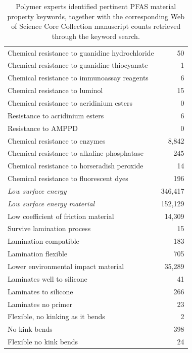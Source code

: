 \begin{table}[h!]
\begin{tabular}{|l|r|}
Chemical resistance to guanidine hydrochloride & 50 \\
Chemical resistance to guanidine thiocyanate & 1 \\
Chemical resistance to immunoassay reagents & 6 \\
Chemical resistance to luminol & 15 \\
Chemical resistance to acridinium esters & 0 \\
Resistance to acridinium esters & 6 \\
Resistance to AMPPD & 0 \\
Chemical resistance to enzymes & 8,842 \\
Chemical resistance to alkaline phosphatase & 245 \\
Chemical resistance to horseradish peroxide & 14 \\
Chemical resistance to fluorescent dyes & 196 \\
\textit{Low surface energy} & 346,417 \\
\textit{Low surface energy material} & 152,129 \\
Low coefficient of friction material & 14,309 \\
Survive lamination process & 15 \\
Lamination compatible & 183 \\
Lamination flexible & 705 \\
Lower environmental impact material & 35,289 \\
Laminates well to silicone & 41 \\
Laminates to silicone & 266 \\
Laminates no primer & 23 \\
Flexible, no kinking as it bends & 2 \\
No kink bends & 398 \\
Flexible no kink bends & 24 \\
\hline
\end{tabular}
\caption{Polymer experts identified pertinent PFAS material property keywords, together with the corresponding Web of Science Core Collection manuscript counts retrieved through the keyword search.}
\captionsetup{skip=5pt}
\label{tab:pfas_keywords}
\end{table}

